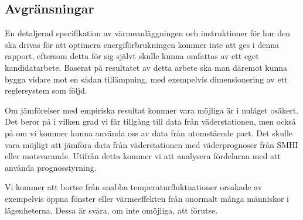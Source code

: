 \subsection{Avgränsningar}

En detaljerad specifikation av värmeanläggningen och instruktioner för hur den ska drivas för att optimera energiförbrukningen kommer inte att ges i denna rapport, eftersom detta för sig självt skulle kunna omfattas av ett eget kandidatarbete. Baserat på resultatet av detta arbete ska man däremot kunna bygga vidare mot en sådan tillämpning, med exempelvis dimensionering av ett reglersystem som följd.

Om jämförelser med empiriska resultat kommer vara möjliga är i nuläget osäkert. Det beror på i vilken grad vi får tillgång till data från väderstationen, men också på om vi kommer kunna använda oss av data från utomstående part. Det skulle vara möjligt att jämföra data från väderstationen med väderprognoser från SMHI eller motsvarande. Utifrån detta kommer vi att analysera fördelarna med att använda prognosstyrning.

Vi kommer att bortse från snabba temperaturfluktuationer orsakade av exempelvis öppna fönster eller värmeeffekten från onormalt många människor i lägenheterna. Dessa är svåra, om inte omöjliga, att förutse.
